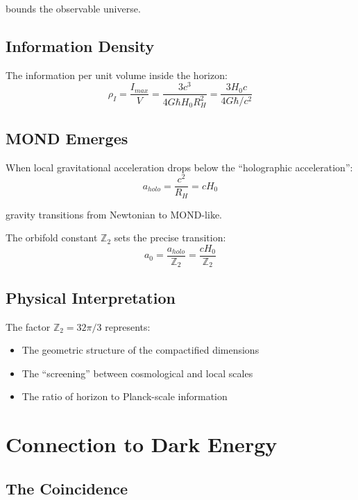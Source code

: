 \documentclass[12pt,a4paper]{article}
\begin{document}
bounds the observable universe.

\subsection{Information Density}

The information per unit volume inside the horizon:
\begin{equation}
\rho_I = \frac{I_{max}}{V} = \frac{3c^3}{4G\hbar H_0 R_H^2} = \frac{3H_0 c}{4G\hbar/c^2}
\end{equation}

\subsection{MOND Emerges}

When local gravitational acceleration drops below the ``holographic acceleration'':
\begin{equation}
a_{holo} = \frac{c^2}{R_H} = cH_0
\end{equation}

gravity transitions from Newtonian to MOND-like.

The orbifold constant $\mathbb{Z}_2$ sets the precise transition:
\begin{equation}
a_0 = \frac{a_{holo}}{\mathbb{Z}_2} = \frac{cH_0}{\mathbb{Z}_2}
\end{equation}

\subsection{Physical Interpretation}

The factor $\mathbb{Z}_2 = 32\pi/3$ represents:
\begin{itemize}
    \item The geometric structure of the compactified dimensions
    \item The ``screening'' between cosmological and local scales
    \item The ratio of horizon to Planck-scale information
\end{itemize}

\section{Connection to Dark Energy}

\subsection{The Coincidence}
\end{document}
